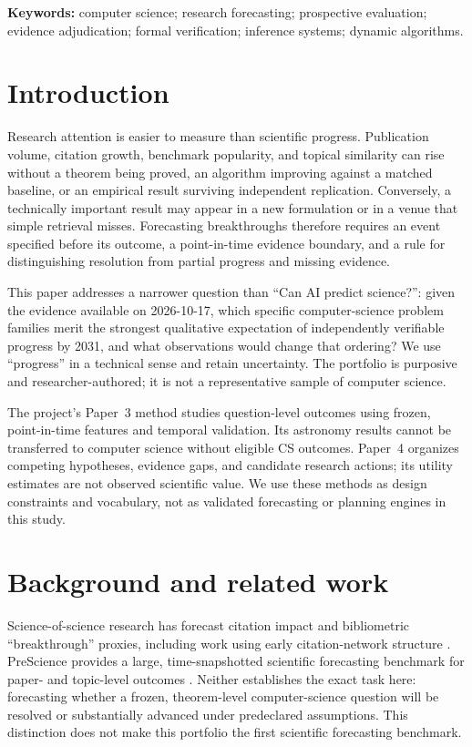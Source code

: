 \documentclass[11pt]{article}
\begin{document}
\noindent\textbf{Keywords:} computer science; research forecasting; prospective evaluation; evidence adjudication; formal verification; inference systems; dynamic algorithms.

\section{Introduction}
Research attention is easier to measure than scientific progress. Publication volume, citation growth, benchmark popularity, and topical similarity can rise without a theorem being proved, an algorithm improving against a matched baseline, or an empirical result surviving independent replication. Conversely, a technically important result may appear in a new formulation or in a venue that simple retrieval misses. Forecasting breakthroughs therefore requires an event specified before its outcome, a point-in-time evidence boundary, and a rule for distinguishing resolution from partial progress and missing evidence.

This paper addresses a narrower question than ``Can AI predict science?'': given the evidence available on 2026-10-17, which specific computer-science problem families merit the strongest qualitative expectation of independently verifiable progress by 2031, and what observations would change that ordering? We use ``progress'' in a technical sense and retain uncertainty. The portfolio is purposive and researcher-authored; it is not a representative sample of computer science.

The project's Paper~3 method studies question-level outcomes using frozen, point-in-time features and temporal validation. Its astronomy results cannot be transferred to computer science without eligible CS outcomes. Paper~4 organizes competing hypotheses, evidence gaps, and candidate research actions; its utility estimates are not observed scientific value. We use these methods as design constraints and vocabulary, not as validated forecasting or planning engines in this study.

\section{Background and related work}
Science-of-science research has forecast citation impact and bibliometric ``breakthrough'' proxies, including work using early citation-network structure \citep{min2021breakthrough}. PreScience provides a large, time-snapshotted scientific forecasting benchmark for paper- and topic-level outcomes \citep{ajith2026prescience}. Neither establishes the exact task here: forecasting whether a frozen, theorem-level computer-science question will be resolved or substantially advanced under predeclared assumptions. This distinction does not make this portfolio the first scientific forecasting benchmark.
\end{document}
